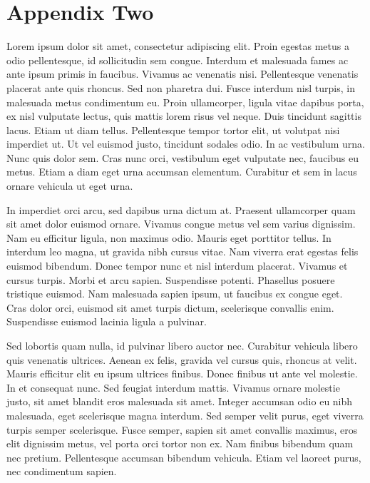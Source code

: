 \documentclass[12pt]{article}
\begin{document}
\newpage
\section{Appendix Two
\label{sec:appendix:two}}
\renewcommand{\thetable}{C\arabic{table}}
\setcounter{table}{0}
\renewcommand{\thefigure}{C\arabic{figure}}
\setcounter{figure}{0}

Lorem ipsum dolor sit amet, consectetur adipiscing elit. Proin egestas metus a odio pellentesque, id sollicitudin sem congue. Interdum et malesuada fames ac ante ipsum primis in faucibus. Vivamus ac venenatis nisi. Pellentesque venenatis placerat ante quis rhoncus. Sed non pharetra dui. Fusce interdum nisl turpis, in malesuada metus condimentum eu. Proin ullamcorper, ligula vitae dapibus porta, ex nisl vulputate lectus, quis mattis lorem risus vel neque. Duis tincidunt sagittis lacus. Etiam ut diam tellus. Pellentesque tempor tortor elit, ut volutpat nisi imperdiet ut. Ut vel euismod justo, tincidunt sodales odio. In ac vestibulum urna. Nunc quis dolor sem. Cras nunc orci, vestibulum eget vulputate nec, faucibus eu metus. Etiam a diam eget urna accumsan elementum. Curabitur et sem in lacus ornare vehicula ut eget urna.

In imperdiet orci arcu, sed dapibus urna dictum at. Praesent ullamcorper quam sit amet dolor euismod ornare. Vivamus congue metus vel sem varius dignissim. Nam eu efficitur ligula, non maximus odio. Mauris eget porttitor tellus. In interdum leo magna, ut gravida nibh cursus vitae. Nam viverra erat egestas felis euismod bibendum. Donec tempor nunc et nisl interdum placerat. Vivamus et cursus turpis. Morbi et arcu sapien. Suspendisse potenti. Phasellus posuere tristique euismod. Nam malesuada sapien ipsum, ut faucibus ex congue eget. Cras dolor orci, euismod sit amet turpis dictum, scelerisque convallis enim. Suspendisse euismod lacinia ligula a pulvinar.

Sed lobortis quam nulla, id pulvinar libero auctor nec. Curabitur vehicula libero quis venenatis ultrices. Aenean ex felis, gravida vel cursus quis, rhoncus at velit. Mauris efficitur elit eu ipsum ultrices finibus. Donec finibus ut ante vel molestie. In et consequat nunc. Sed feugiat interdum mattis. Vivamus ornare molestie justo, sit amet blandit eros malesuada sit amet. Integer accumsan odio eu nibh malesuada, eget scelerisque magna interdum. Sed semper velit purus, eget viverra turpis semper scelerisque. Fusce semper, sapien sit amet convallis maximus, eros elit dignissim metus, vel porta orci tortor non ex. Nam finibus bibendum quam nec pretium. Pellentesque accumsan bibendum vehicula. Etiam vel laoreet purus, nec condimentum sapien.
\end{document}
